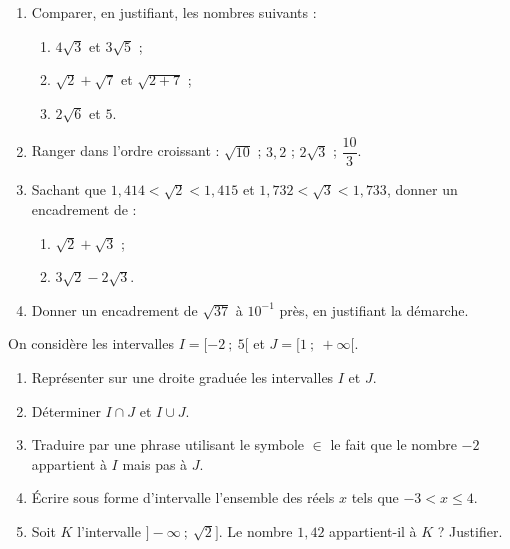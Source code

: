 \documentclass[11pt]{article}
\begin{document}
\begin{exercice}
\begin{enumerate}
\item Comparer, en justifiant, les nombres suivants :
\begin{enumerate}
\item $4\sqrt{3}$ et $3\sqrt{5}$ ;
\item $\sqrt{2} + \sqrt{7}$ et $\sqrt{2 + 7}$ ;
\item $2\sqrt{6}$ et $5$.
\end{enumerate}
\item Ranger dans l'ordre croissant : $\sqrt{10}$ ; $3{,}2$ ; $2\sqrt{3}$ ; $\dfrac{10}{3}$.
\item Sachant que $1{,}414 < \sqrt{2} < 1{,}415$ et $1{,}732 < \sqrt{3} < 1{,}733$, donner un encadrement de :
\begin{enumerate}
\item $\sqrt{2} + \sqrt{3}$ ;
\item $3\sqrt{2} - 2\sqrt{3}$.
\end{enumerate}
\item Donner un encadrement de $\sqrt{37}$ à $10^{-1}$ près, en justifiant la démarche.
\end{enumerate}
\end{exercice}

\begin{exercice}
On considère les intervalles $I = [-2 \ ;\ 5[$ et $J = [1 \ ;\ +\infty[$.
\begin{enumerate}
\item Représenter sur une droite graduée les intervalles $I$ et $J$.
\item Déterminer $I \cap J$ et $I \cup J$.
\item Traduire par une phrase utilisant le symbole $\in$ le fait que le nombre $-2$ appartient à $I$ mais pas à $J$.
\item Écrire sous forme d'intervalle l'ensemble des réels $x$ tels que $-3 < x \leq 4$.
\item Soit $K$ l'intervalle $]-\infty \ ;\ \sqrt{2}]$. Le nombre $1{,}42$ appartient-il à $K$ ? Justifier.
\end{enumerate}
\end{exercice}
\end{document}
